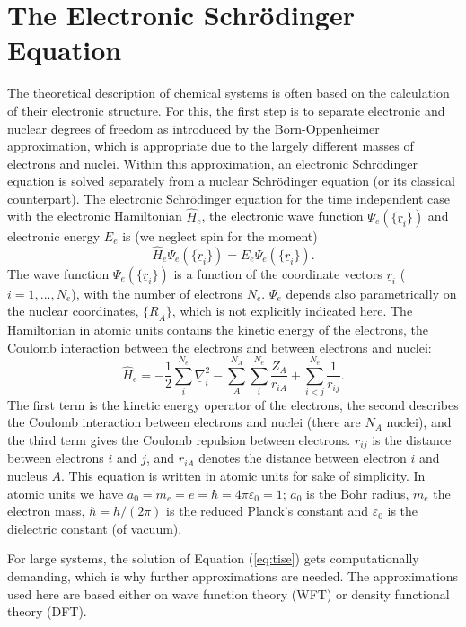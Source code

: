 \documentclass[11pt,DIV=13,BCOR=5mm,a4paper,headinclude]{scrbook}
\renewcommand{\vec}[1]{\underline{#1}}
\begin{document}
\section{The Electronic Schr\"{o}dinger Equation}
The theoretical description of chemical systems is often based on the calculation of their electronic structure.
For this, the first step is to separate electronic and nuclear degrees of freedom as introduced by the Born-Oppenheimer approximation\cite{bornoppenheimer}, which is appropriate due to the largely different masses of electrons and nuclei.
Within this approximation, an electronic Schrödinger equation is solved separately from a nuclear Schrödinger equation (or its classical counterpart).
The electronic Schrödinger equation for the time independent case  with the electronic Hamiltonian $\hat{H}_e$, the electronic wave function $\Psi_e(\{\vec{r}_i\})$ and electronic energy $E_e$ is (we neglect spin for the moment)
\begin{equation}\label{eq:tise}
 \hat{H}_e\Psi_e(\{\vec{r}_i\})=E_e\Psi_e(\{\vec{r}_i\}).
\end{equation}
The wave function $\Psi_e(\{\vec{r}_i\})$ is a function of the coordinate vectors $\vec{r}_i$ ($i=1,...,N_e$), with the number of electrons $N_e$.
$\Psi_e$ depends also parametrically on the nuclear coordinates, $\{\vec{R}_A\}$, which is not explicitly indicated here.
The Hamiltonian in atomic units contains the kinetic energy of the electrons, the Coulomb interaction between the electrons and between electrons and nuclei:
\begin{equation}
 \hat{H}_e= -\frac{1}{2}\sum_i^{N_e}\vec{\nabla}_i^2 - \sum_A^{N_A}\sum_i^{N_e}\frac{Z_A}{r_{iA}} + \sum_{i<j}^{N_e}\frac{1}{r_{ij}}.
\end{equation}
The first term is the kinetic energy operator of the electrons, the second describes the Coulomb interaction between electrons and nuclei (there are $N_A$ nuclei), and the third term gives the Coulomb repulsion between electrons.
$r_{ij}$ is the distance between electrons $i$ and $j$, and $r_{iA}$ denotes the distance between electron $i$ and nucleus $A$.
This equation is written in atomic units for sake of simplicity.
In atomic units we have $a_0=m_e=e=\hbar=4\pi\varepsilon_0=1$; $a_0$ is the Bohr radius, $m_e$ the electron mass, $\hbar=h/(2\pi)$ is the reduced Planck's constant and $\varepsilon_0$ is the dielectric constant (of vacuum).

For large systems, %
the solution of Equation (\ref{eq:tise}) gets computationally demanding, which is why further approximations are needed.
The approximations used here are based either on wave function theory (WFT) or density functional theory (DFT).
\end{document}
